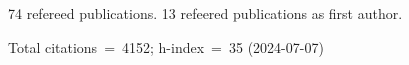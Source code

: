 74 refereed publications. 13 refeered publications as first author.

Total citations~=~4152; h-index~=~35 (2024-07-07)